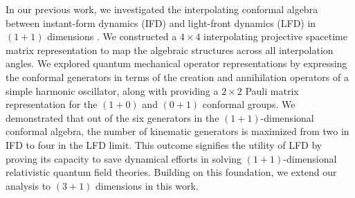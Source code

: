 \documentclass[foundations,article,submit,pdftex,moreauthors]{Definitions/mdpi}
\begin{document}
In our previous work, we investigated the interpolating conformal algebra between instant-form dynamics (IFD) and light-front dynamics (LFD) in $(1+1)$ dimensions \cite{Ji-Hari-2026-PRD}. We constructed a $4\times4$ interpolating projective spacetime matrix representation to map the algebraic structures across all interpolation angles. We explored quantum mechanical operator representations by expressing the conformal generators in terms of the creation and annihilation operators of a simple harmonic oscillator, along with providing a $2\times2$ Pauli matrix representation for the $(1+0)$ and $(0+1)$ conformal groups. We demonstrated that out of the six generators in the $(1+1)$-dimensional conformal algebra, the number of kinematic generators is maximized from two in IFD to four in the LFD limit. This outcome signifies the utility of LFD by proving its capacity to save dynamical efforts in solving $(1+1)$-dimensional relativistic quantum field theories. Building on this foundation, we extend our analysis to $(3+1)$ dimensions in this work.
\end{document}
